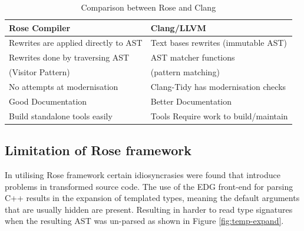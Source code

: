 \documentclass[bsc,frontabs,singlespacing,twoside,parskip,deptreport]{infthesis}
\begin{document}
\begin{table}[h]
    \begin{center}
        \begin{tabular}{| l | l |}
            \hline
             \textbf{Rose Compiler}               & \textbf{Clang/LLVM}                 \\ \hline
             Rewrites are applied directly to AST & Text bases rewrites (immutable AST) \\ \hline
             Rewrites done by traversing AST      & AST matcher functions               \\ 
             (Visitor Pattern)                    & (pattern matching)                  \\ \hline
             No attempts at modernisation         & Clang-Tidy has modernisation checks \\ \hline
             Good Documentation                   & Better Documentation                \\ \hline
             Build standalone tools easily        & Tools Require work to build/maintain\\ \hline
        \end{tabular}
        \caption{Comparison between Rose and Clang }
        \label{tab:cmp-rose-clang}
    \end{center}
\end{table}
    



\subsection{Limitation of Rose framework}
In utilising Rose framework certain idiosyncrasies were found that introduce problems in transformed source code. The use of the EDG front-end for parsing C++ results in the expansion of templated types, meaning the default arguments that are usually hidden are present. Resulting in harder to read type signatures when the resulting AST was un-parsed as shown in Figure \ref{fig:temp-expand}. 
\end{document}

